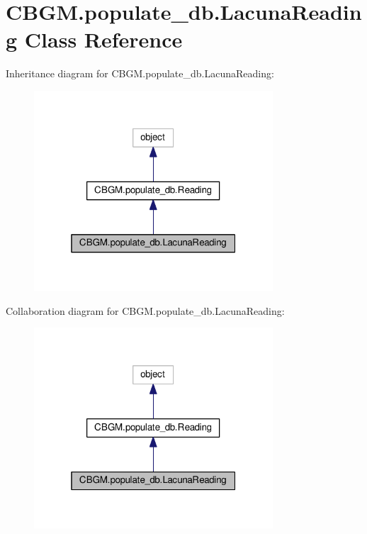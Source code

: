 \hypertarget{classCBGM_1_1populate__db_1_1LacunaReading}{}\section{C\+B\+G\+M.\+populate\+\_\+db.\+Lacuna\+Reading Class Reference}
\label{classCBGM_1_1populate__db_1_1LacunaReading}


Inheritance diagram for C\+B\+G\+M.\+populate\+\_\+db.\+Lacuna\+Reading\+:\nopagebreak
\begin{figure}[H]
\begin{center}
\leavevmode
\includegraphics[width=253pt]{classCBGM_1_1populate__db_1_1LacunaReading__inherit__graph}
\end{center}
\end{figure}


Collaboration diagram for C\+B\+G\+M.\+populate\+\_\+db.\+Lacuna\+Reading\+:\nopagebreak
\begin{figure}[H]
\begin{center}
\leavevmode
\includegraphics[width=253pt]{classCBGM_1_1populate__db_1_1LacunaReading__coll__graph}
\end{center}
\end{figure}
